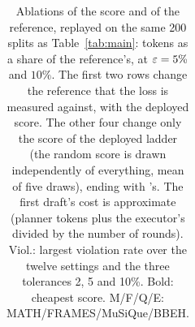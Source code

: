 \begin{table}[h]
\begin{tabular}{@{}lrrrrrrrrrrrrrr@{}}
\bottomrule
\end{tabular}
\caption{Ablations of the score and of the reference, replayed on the same 200 splits as Table~\ref{tab:main}: tokens as a share of the reference's, at $\varepsilon = 5\%$ and $10\%$. The first two rows change the reference that the loss is measured against, with the deployed score. The other four change only the score of the deployed ladder (the random score is drawn independently of everything, mean of five draws), ending with \climb{}'s. The first draft's cost is approximate (planner tokens plus the executor's divided by the number of rounds). Viol.: largest violation rate over the twelve settings and the three tolerances 2, 5 and 10\%. Bold: cheapest score. M/F/Q/E: MATH/FRAMES/MuSiQue/BBEH.}
\label{tab:ablations}
\end{table}
